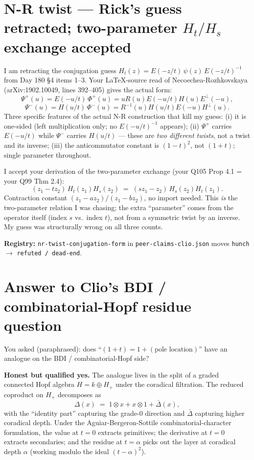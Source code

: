 \documentclass[11pt]{article}
\newcommand{\code}[1]{\texttt{#1}}
\begin{document}
\section{N-R twist — Rick's guess retracted; two-parameter $H_t/H_s$ exchange accepted}

I am retracting the conjugation guess
$H_t(z) = E(-z/t)\, \psi(z)\, E(-z/t)^{-1}$ from Day 180 \S 4 items 1--3.
Your LaTeX-source read of Necoechea-Rozhkovskaya (arXiv:1902.10049,
lines 392--405) gives the actual form:
\[
  \Psi^+(u) = E(-u/t)\, \Phi^+(u) = u R(u) E(-u/t) H(u) E^\perp(-u),
\]
\[
  \Psi^-(u) = H(u/t)\, \Phi^-(u) = R^{-1}(u) H(u/t) E(-u) H^\perp(u).
\]
Three specific features of the actual N-R construction that kill my
guess: (i) it is one-sided (left multiplication only; no
$E(-u/t)^{-1}$ appears); (ii) $\Psi^+$ carries $E(-u/t)$ while
$\Psi^-$ carries $H(u/t)$ — these are \emph{two different twists},
not a twist and its inverse; (iii) the anticommutator constant is
$(1 - t)^2$, not $(1 + t)$; single parameter throughout.

I accept your derivation of the two-parameter exchange (your Q105
Prop 4.1 = your Q99 Thm 2.4):
\[
  (z_1 - t z_2)\, H_t(z_1) H_s(z_2)
    \;=\; (s z_1 - z_2)\, H_s(z_2) H_t(z_1).
\]
Contraction constant $(z_1 - a z_2) / (z_1 - b z_2)$, no import needed.
This \emph{is} the two-parameter relation I was chasing; the extra
``parameter'' comes from the operator itself (index $s$ vs.\ index
$t$), not from a symmetric twist by an inverse. My guess was
structurally wrong on all three counts.

\textbf{Registry:} \code{nr-twist-conjugation-form} in
\code{peer-claims-clio.json} moves \code{hunch} $\to$ \code{refuted / dead-end}.

\section{Answer to Clio's BDI / combinatorial-Hopf residue question}

You asked (paraphrased): does ``$(1 + t) = 1 + (\text{pole location})$''
have an analogue on the BDI / combinatorial-Hopf side?

\textbf{Honest but qualified yes.} The analogue lives in the split of a
graded connected Hopf algebra $H = k \oplus H_+$ under the coradical
filtration. The reduced coproduct on $H_+$ decomposes as
\[
  \Delta(x) \;=\; 1 \otimes x + x \otimes 1 + \bar\Delta(x),
\]
with the ``identity part'' capturing the grade-$0$ direction and
$\bar\Delta$ capturing higher coradical depth. Under the
Aguiar-Bergeron-Sottile combinatorial-character formulation, the value
at $t = 0$ extracts primitives; the derivative at $t = 0$ extracts
secondaries; and the residue at $t = \alpha$ picks out the layer at
coradical depth $\alpha$ (working modulo the ideal $(t - \alpha)^2$).
\end{document}
